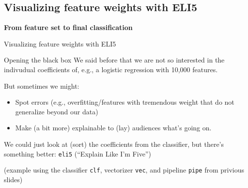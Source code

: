 \documentclass{beamer}
\begin{document}
\subsection{Visualizing feature weights with ELI5}

\begin{frame}[plain]
\textbf{From feature set to final classification}

Visualizing feature weights with ELI5
\end{frame}



\begin{frame}{Opening the black box}
We said before that we are not so interested in the indivudual coefficients of, e.g., a logistic regression with 10,000 features.

\pause 

But sometimes we might:
\begin{itemize}[<+->]
\item Spot errors (e.g., overfitting/features with tremendous weight that do not generalize beyond our data) 
\item Make (a bit more) explainable to (lay) audiences what's going on.
\end{itemize}

\pause

We could just look at (sort) the coefficients from the classifier, but there's something better: \texttt{eli5} (``Explain Like I'm Five'')
\end{frame}




\begin{frame}[plain]
(example using the classifier \texttt{clf}, vectorizer \texttt{vec}, and pipeline \texttt{pipe} from privious slides)
\end{frame}
\end{document}
